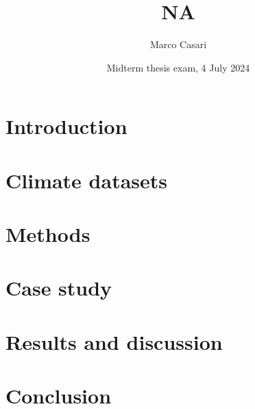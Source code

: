 \documentclass[aspectratio=43]{beamer}
\title{NA}  %
\author{Marco Casari}
\date[04/05/2024]{Midterm thesis exam, 4 July 2024}
\institute[UniTo]{University of Turin}
\begin{document}
\section{Introduction}

\section{Climate datasets}

\section{Methods}

\section{Case study}

\section{Results and discussion}

\section{Conclusion}
\end{document}
